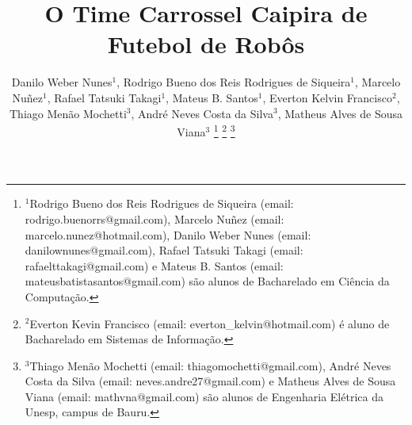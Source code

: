 \title{\LARGE \bf
O Time Carrossel Caipira de Futebol de Rob{\^o}s
}

\author{{\centering Danilo Weber Nunes$^{1}$, Rodrigo Bueno dos Reis Rodrigues de Siqueira$^{1}$, Marcelo Nu{\~n}ez$^{1}$, Rafael Tatsuki Takagi$^{1}$,}%
{\authorblockN \centering Mateus B. Santos$^{1}$, Everton Kelvin Francisco$^{2}$, Thiago Menão Mochetti$^{3}$, André Neves Costa da Silva$^{3}$,}%
{\authorblockN \centering Matheus Alves de Sousa Viana$^{3}$}%
\thanks{$^{1}$Rodrigo Bueno dos Reis Rodrigues de Siqueira (email: rodrigo.buenorrs@gmail.com),
Marcelo Nuñez (email: marcelo.nunez@hotmail.com), Danilo Weber Nunes (email: danilownunes@gmail.com), Rafael Tatsuki Takagi (email: rafaelttakagi@gmail.com) e Mateus B. Santos (email: mateusbatistasantos@gmail.com) são alunos de Bacharelado em Ciência da Computação.}
\thanks{$^{2}$Everton Kevin Francisco (email: everton\_kelvin@hotmail.com) {\'e} aluno de Bacharelado em Sistemas de Informa{\c c}{\~a}o.}
\thanks{$^{3}$Thiago Men{\~a}o Mochetti (email: thiagomochetti@gmail.com), André Neves Costa da Silva (email: neves.andre27@gmail.com) e Matheus Alves de Sousa Viana (email: mathvna@gmail.com) s{\~a}o alunos de Engenharia El{\'e}trica da Unesp, campus de Bauru.}
}
